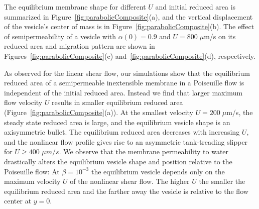 \documentclass[prb,preprint,showpacs,preprintnumbers,amsmath,amssymb,longbibliography]{revtex4-1}
\begin{document}
The equilibrium membrane shape for different $U$ and initial
reduced area is summarized in Figure~\ref{fig:parabolicComposite}(a),
and the vertical displacement of the vesicle's center of mass is in
Figure~\ref{fig:parabolicComposite}(b). The effect of semipermeability
of a vesicle with $\alpha(0) = 0.9$ and $U=800\; \mu$m/s on its reduced
area and migration pattern are shown in
Figures~\ref{fig:parabolicComposite}(c)
and~\ref{fig:parabolicComposite}(d), respectively. 


As observed for the linear shear flow, our simulations 
show that the equilibrium reduced area of a semipermeable inextensible membrane in a
Poiseuille flow is independent of the initial reduced area.
 Instead we find that larger maximum flow velocity $U$ results
in smaller equilibrium reduced area
(Figure~\ref{fig:parabolicComposite}(a)). At the smallest velocity $U=
200\; \mu$m/s, the steady state reduced area is large, and the
equilibrium vesicle shape is an axisymmetric bullet. The equilibrium
reduced area decreases with increasing $U$, and the nonlinear flow
profile gives rise to an asymmetric tank-treading slipper for $U\ge 400$
$\mu m/s$. We observe that the membrane permeability to water
drastically alters the equilibrium vesicle shape and position relative
to the Poiseuille flow: At $\beta=10^{-3}$ the equilibrium vesicle
depends only on the maximum velocity $U$ of the nonlinear shear flow.
The higher $U$ the smaller the equilibrium reduced area and the farther
away the vesicle is relative to the flow center at $y=0$.

\end{document}

